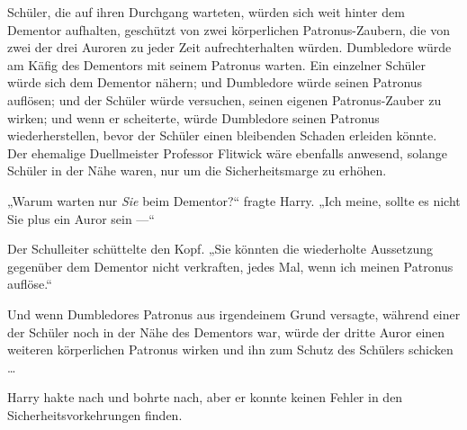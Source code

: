 Schüler, die auf ihren Durchgang warteten, würden sich weit hinter dem Dementor aufhalten, geschützt von zwei körperlichen Patronus-Zaubern, die von zwei der drei Auroren zu jeder Zeit aufrechterhalten würden. Dumbledore würde am Käfig des Dementors mit seinem Patronus warten. Ein einzelner Schüler würde sich dem Dementor nähern; und Dumbledore würde seinen Patronus auflösen; und der Schüler würde versuchen, seinen eigenen Patronus-Zauber zu wirken; und wenn er scheiterte, würde Dumbledore seinen Patronus wiederherstellen, bevor der Schüler einen bleibenden Schaden erleiden könnte. Der ehemalige Duellmeister Professor Flitwick wäre ebenfalls anwesend, solange Schüler in der Nähe waren, nur um die Sicherheitsmarge zu erhöhen.

„Warum warten nur \emph{Sie} beim Dementor?“ fragte Harry.
„Ich meine, sollte es nicht Sie plus ein Auror sein —“

Der Schulleiter schüttelte den Kopf.
„Sie könnten die wiederholte Aussetzung gegenüber dem Dementor nicht verkraften, jedes Mal, wenn ich meinen Patronus auflöse.“

Und wenn Dumbledores Patronus aus irgendeinem Grund versagte, während einer der Schüler noch in der Nähe des Dementors war, würde der dritte Auror einen weiteren körperlichen Patronus wirken und ihn zum Schutz des Schülers schicken …

Harry hakte nach und bohrte nach, aber er konnte keinen Fehler in den Sicherheitsvorkehrungen finden.

